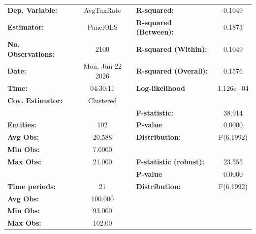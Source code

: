 \begin{center}
\begin{tabular}{lclc}
\toprule
\textbf{Dep. Variable:}                       &     AvgTaxRate     & \textbf{  R-squared:         }   &      0.1049      \\
\textbf{Estimator:}                           &      PanelOLS      & \textbf{  R-squared (Between):}  &      0.1873      \\
\textbf{No. Observations:}                    &        2100        & \textbf{  R-squared (Within):}   &      0.1049      \\
\textbf{Date:}                                &  Mon, Jun 22 2026  & \textbf{  R-squared (Overall):}  &      0.1576      \\
\textbf{Time:}                                &      04:30:11      & \textbf{  Log-likelihood     }   &    1.126e+04     \\
\textbf{Cov. Estimator:}                      &     Clustered      & \textbf{                     }   &                  \\
\textbf{}                                     &                    & \textbf{  F-statistic:       }   &      38.914      \\
\textbf{Entities:}                            &        102         & \textbf{  P-value            }   &      0.0000      \\
\textbf{Avg Obs:}                             &       20.588       & \textbf{  Distribution:      }   &    F(6,1992)     \\
\textbf{Min Obs:}                             &       7.0000       & \textbf{                     }   &                  \\
\textbf{Max Obs:}                             &       21.000       & \textbf{  F-statistic (robust):} &      23.555      \\
\textbf{}                                     &                    & \textbf{  P-value            }   &      0.0000      \\
\textbf{Time periods:}                        &         21         & \textbf{  Distribution:      }   &    F(6,1992)     \\
\textbf{Avg Obs:}                             &      100.000       & \textbf{                     }   &                  \\
\textbf{Min Obs:}                             &       93.000       & \textbf{                     }   &                  \\
\textbf{Max Obs:}                             &       102.00       & \textbf{                     }   &                  \\

\end{tabular}
\end{center}
